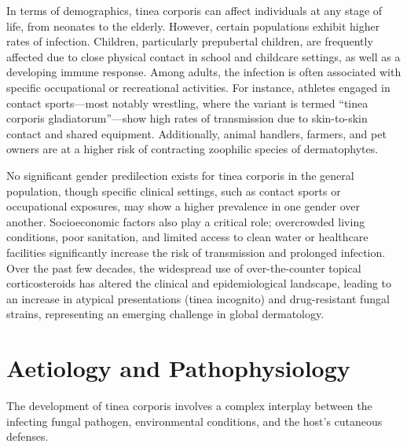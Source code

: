 In terms of demographics, tinea corporis can affect individuals at any stage of life, from neonates to the elderly. However, certain populations exhibit higher rates of infection. Children, particularly prepubertal children, are frequently affected due to close physical contact in school and childcare settings, as well as a developing immune response. Among adults, the infection is often associated with specific occupational or recreational activities. For instance, athletes engaged in contact sports---most notably wrestling, where the variant is termed ``tinea corporis gladiatorum''---show high rates of transmission due to skin-to-skin contact and shared equipment. Additionally, animal handlers, farmers, and pet owners are at a higher risk of contracting zoophilic species of dermatophytes.

No significant gender predilection exists for tinea corporis in the general population, though specific clinical settings, such as contact sports or occupational exposures, may show a higher prevalence in one gender over another. Socioeconomic factors also play a critical role; overcrowded living conditions, poor sanitation, and limited access to clean water or healthcare facilities significantly increase the risk of transmission and prolonged infection. Over the past few decades, the widespread use of over-the-counter topical corticosteroids has altered the clinical and epidemiological landscape, leading to an increase in atypical presentations (tinea incognito) and drug-resistant fungal strains, representing an emerging challenge in global dermatology.

\section*{Aetiology and Pathophysiology}
The development of tinea corporis involves a complex interplay between the infecting fungal pathogen, environmental conditions, and the host's cutaneous defenses.

